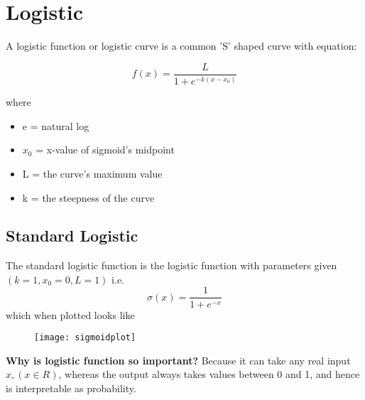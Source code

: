 \documentclass[10pt,a4paper]{article}
\begin{document}
	\section{Logistic}	
	A logistic function or logistic curve is a common 'S' shaped curve with equation:
	
	\begin{equation}
			f(x) = \frac{L}{1 + e^{-k(x-x_0)}}
	\end{equation}

	
	where
	\begin{itemize}
		\item e = natural log
		\item $x_0$ = x-value of sigmoid's midpoint
		\item L = the curve's maximum value
		\item k = the steepness of the curve
	\end{itemize}

	\subsection{Standard Logistic}
	
	The standard logistic function is the logistic function with parameters given $(k = 1, x_0 = 0, L = 1)$
	i.e.\\
	\begin{equation}
		\sigma(x) = \frac{1}{1 + e^{-x}}
	\end{equation}
	which when plotted looks like\\
	\begin{figure}[h]
		\texttt{[image: sigmoidplot]}
		\centering
	\end{figure}

	\textbf{Why is logistic function so important?}
	Because it can take any real input $x, (x \in R)$, whereas the output always takes values between 0 and 1, and hence is interpretable as probability.
	

	
\end{document}
